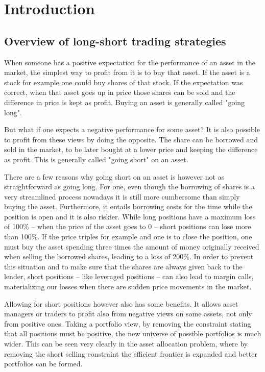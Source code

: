 \section{Introduction}
\subsection{Overview of long-short trading strategies}
When someone has a positive expectation for the performance of an asset in the market, the simplest way to profit from it is to buy that asset. If the asset is a stock for example one could buy shares of that stock. If the expectation was correct, when that asset goes up in price those shares can be sold and the difference in price is kept as profit. Buying an asset is generally called "going long".

But what if one expects a negative performance for some asset? It is also possible to profit from these views by doing the opposite. The share can be borrowed and sold in the market, to be later bought at a lower price and keeping the difference as profit. This is generally called "going short" on an asset.

There are a few reasons why going short on an asset is however not as straightforward as going long. For one, even though the borrowing of shares is a very streamlined process nowadays it is still more cumbersome than simply buying the asset. Furthermore, it entails borrowing costs for the time while the position is open and it is also riskier. While long positions have a maximum loss of 100\% -- when the price of the asset goes to 0 -- short positions can lose more than 100\%. If the price triples for example and one is to close the position, one must buy the asset spending three times the amount of money originally received when selling the borrowed shares, leading to a loss of 200\%. In order to prevent this situation and to make sure that the shares are always given back to the lender, short positions -- like leveraged positions --  can also lead to margin calls, materializing our losses when there are sudden price movements in the market.

Allowing for short positions however also has some benefits. It allows asset managers or traders to profit also from negative views on some assets, not only from positive ones. Taking a portfolio view, by removing the constraint stating that all positions must be positive, the new universe of possible portfolios is much wider. This can be seen very clearly in the asset allocation problem, where by removing the short selling constraint the efficient frontier is expanded and better portfolios can be formed. 

